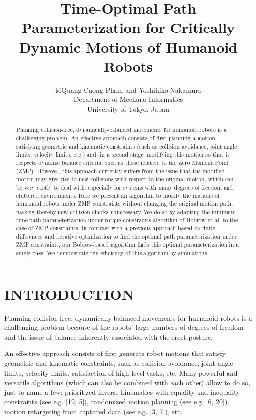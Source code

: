 \documentclass[journal]{IEEEtran}
\author{MQuang-Cuong Pham and Yoshihiko Nakamura
\\Department of Mechano-Informatics
\\University of Tokyo, Japan}
\title{\textbf{Time-Optimal Path Parameterization for Critically Dynamic Motions of Humanoid Robots}}
\begin{document}
 

\maketitle

\begin{abstract}
Planning collision-free, dynamically-balanced movements for humanoid robots is a challenging problem. An effective approach consists of first planning a motion satisfying geometric and kinematic constraints (such as collision avoidance, joint angle limits, velocity limits, etc.) and, in a second stage, modifying this motion so that it respects dynamic balance criteria, such as those relative to the Zero Moment Point (ZMP). However, this approach currently suffers from the issue that the modified motion may give rise to new collisions with respect to the original motion, which can be very costly to deal with, especially for systems with many degrees of freedom and cluttered environments. Here we present an algorithm to modify the motions of humanoid robots under ZMP constraints without changing the original motion path, making thereby new collision checks unnecessary. We do so by adapting the minimum-time path parameterization under torque constraints algorithm of Bobrow et al. to the case of ZMP constraints. In contrast with a previous approach based on finite differences and iterative optimization to find the optimal path parameterization under ZMP constraints, our Bobrow-based algorithm finds this optimal parameterization in a single pass. We demonstrate the efficiency of this algorithm by simulations.
\end{abstract}

\section{INTRODUCTION}
Planning collision-free, dynamically-balanced movements
for humanoid robots is a challenging problem because of the robots’ large numbers of degrees of freedom and the issue of balance inherently associated with the erect posture.

An effective approach consists of first generate robot
motions that satisfy geometric and kinematic constraints,
such as collision avoidance, joint angle limits, velocity limits, satisfaction of high-level tasks, etc. Many powerful and versatile algorithms (which can also be combined with each other) allow to do so, just to name a few: prioritized inverse kinematics with equality and inequality constraints (see e.g. [19, 5]), randomized motion planning (see e.g. [6, 20]), motion retargeting from captured data (see e.g. [3, 7]), etc.
\end{document}
